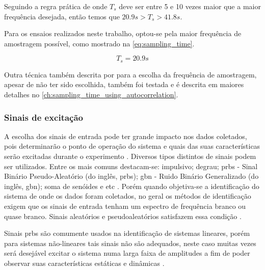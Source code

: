 Seguindo a regra prática de  onde $T_s$ deve ser entre 5 e 10 vezes maior que a
maior frequência desejada, então temos que $20.9s > T_s > 41.8s$.

Para os ensaios realizados neste trabalho, optou-se pela maior frequência de amostragem possível, como
mostrado na \cref{eq:sampling_time}.

\begin{equation}
	\label{eq:sampling_time}
	T_s = 20.9s
\end{equation}

Outra técnica também descrita por  para a escolha da frequência de amostragem,
apesar de não ter sido escolhida, também foi testada e é descrita em maiores detalhes no
\cref{ch:sampling_time_using_autocorrelation}.

\subsubsection{Sinais de excitação}
\label{subsubsec:sinais_de_excitacao}

A escolha dos sinais de entrada pode ter grande impacto nos dados coletados,
pois determinarão o ponto de operação do sistema e quais das suas características serão excitadas
durante o experimento \cite{Aguirre2015}.
Diversos tipos distintos de sinais podem ser utilizados. Entre os mais comuns destacam-se:
impulsivo; degrau; \acrshort{prbs} - Sinal Binário Pseudo-Aleatório (do inglês, \acrlong{prbs});
\acrshort{gbn} - Ruido Binário Generalizado (do inglês, \acrlong{gbn}); soma de senóides e etc \cite{Aguirre2015}.
Porém quando objetiva-se a identificação do sistema de onde os dados foram coletados, no geral
os métodos de identificação exigem que os sinais de entrada tenham um espectro de frequência
branco ou quase branco. Sinais aleatórios e pseudoaleatórios satisfazem essa condição \cite{Aguirre2015}.

Sinais \acrshort{prbs} são comumente usados na identificação de sistemas lineares, porém para sistemas
não-lineares tais sinais não são adequados, neste caso muitas vezes será desejável excitar o
sistema numa larga faixa de amplitudes a fim de poder observar suas características estáticas e dinâmicas
\cite{Aguirre2015}.


